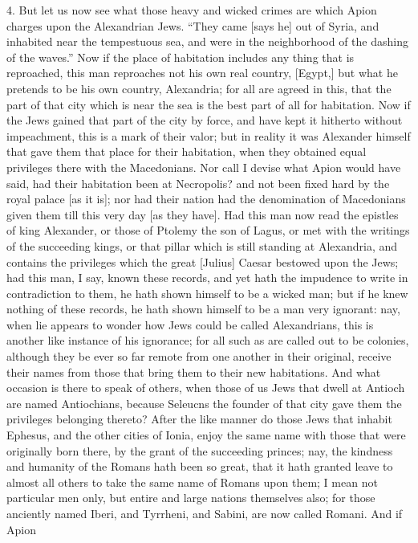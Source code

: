 4. But let us now see what those heavy and wicked crimes are which Apion
charges upon the Alexandrian Jews. ``They came [says he] out of Syria, and
inhabited near the tempestuous sea, and were in the neighborhood of the
dashing of the waves.'' Now if the place of habitation includes any thing
that is reproached, this man reproaches not his own real country, [Egypt,]
but what he pretends to be his own country, Alexandria; for all are agreed
in this, that the part of that city which is near the sea is the best part
of all for habitation. Now if the Jews gained that part of the city by
force, and have kept it hitherto without impeachment, this is a mark of
their valor; but in reality it was Alexander himself that gave them that
place for their habitation, when they obtained equal privileges there with
the Macedonians. Nor call I devise what Apion would have said, had their
habitation been at Necropolis? and not been fixed hard by the royal palace
[as it is]; nor had their nation had the denomination of Macedonians given
them till this very day [as they have]. Had this man now read the epistles
of king Alexander, or those of Ptolemy the son of Lagus, or met with the
writings of the succeeding kings, or that pillar which is still standing
at Alexandria, and contains the privileges which the great [Julius] Caesar
bestowed upon the Jews; had this man, I say, known these records, and yet
hath the impudence to write in contradiction to them, he hath shown
himself to be a wicked man; but if he knew nothing of these records, he
hath shown himself to be a man very ignorant: nay, when lie appears to
wonder how Jews could be called Alexandrians, this is another like
instance of his ignorance; for all such as are called out to be colonies,
although they be ever so far remote from one another in their original,
receive their names from those that bring them to their new habitations.
And what occasion is there to speak of others, when those of us Jews that
dwell at Antioch are named Antiochians, because Seleucns the founder of
that city gave them the privileges belonging thereto? After the like
manner do those Jews that inhabit Ephesus, and the other cities of Ionia,
enjoy the same name with those that were originally born there, by the
grant of the succeeding princes; nay, the kindness and humanity of the
Romans hath been so great, that it hath granted leave to almost all others
to take the same name of Romans upon them; I mean not particular men only,
but entire and large nations themselves also; for those anciently named
Iberi, and Tyrrheni, and Sabini, are now called Romani. And if Apion
